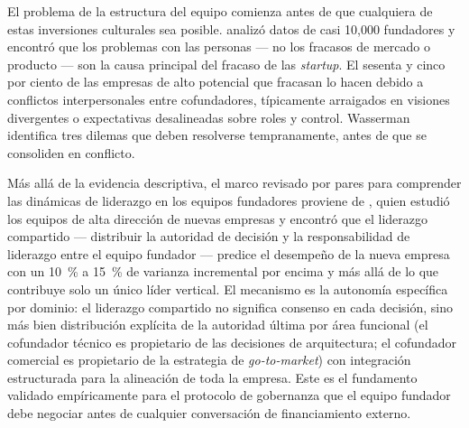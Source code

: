 El problema de la estructura del equipo comienza antes de que cualquiera de estas inversiones
culturales sea posible. \textcite{wasserman2012founders} analizó datos de casi 10,000 fundadores y
encontró que los problemas con las personas --- no los fracasos de mercado o producto --- son la
causa principal del fracaso de las \emph{startup}. El sesenta y cinco por ciento de las empresas
de alto potencial que fracasan lo hacen debido a conflictos interpersonales entre cofundadores,
típicamente arraigados en visiones divergentes o expectativas desalineadas sobre roles y control.
Wasserman identifica tres dilemas que deben resolverse tempranamente, antes de que se consoliden
en conflicto.

Más allá de la evidencia descriptiva, el marco revisado por pares para comprender las dinámicas
de liderazgo en los equipos fundadores proviene de \textcite{ensley2006shared}, quien estudió los
equipos de alta dirección de nuevas empresas y encontró que el liderazgo compartido ---
distribuir la autoridad de decisión y
la responsabilidad de liderazgo entre el equipo fundador --- predice el desempeño de la nueva
empresa con un \qty{10}{\percent} a \qty{15}{\percent} de varianza incremental por encima y más
allá de lo que contribuye solo un único líder vertical. El mecanismo es la autonomía específica
por dominio: el liderazgo compartido no significa consenso en cada decisión, sino más bien
distribución explícita de la autoridad última por área funcional (el cofundador técnico es
propietario de las decisiones de arquitectura; el cofundador comercial es propietario de la
estrategia de \emph{go-to-market}) con integración estructurada para la alineación de toda la
empresa. Este es el fundamento validado empíricamente para el protocolo de gobernanza que el
equipo fundador debe negociar antes de cualquier conversación de financiamiento externo.

